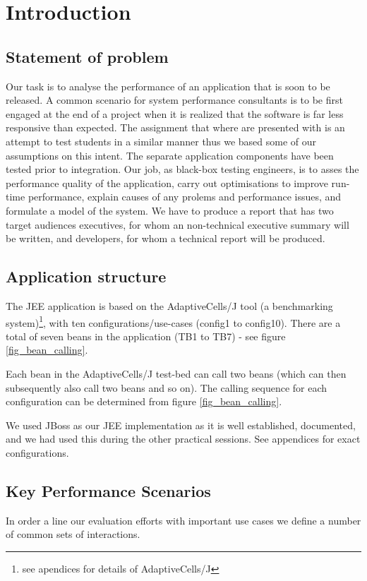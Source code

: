 \chapter{Introduction}

\section{Statement of problem}

Our task is to analyse the performance of an application that is soon to be released. A common scenario for system performance consultants is to be first engaged at the end of a project when it is realized that the software is far less responsive than expected. The assignment that where are presented with is an attempt to test students in a similar manner thus we based some of our assumptions on this intent. The separate application components have been tested prior to integration. Our job, as black-box testing engineers, is to asses the performance quality of the application, carry out optimisations to improve run-time performance, explain causes of any prolems and performance issues, and formulate a model of the system. We have to produce a report that has two target audiences executives, for whom an non-technical executive summary will be written, and developers, for whom a technical report will be produced.

\section{Application structure}

The JEE application is based on the AdaptiveCells/J tool (a benchmarking system)\footnote{see apendices for details of AdaptiveCells/J}, with ten configurations/use-cases (config1 to config10). There are a total of seven beans in the application (TB1 to TB7) - see figure \ref{fig_bean_calling}.

Each bean in the AdaptiveCells/J test-bed can call two beans (which can then subsequently also call two beans and so on). The calling sequence for each configuration can be determined from figure \ref{fig_bean_calling}.

We used JBoss as our JEE implementation as it is well established, documented, and we had used this during the other practical sessions. See appendices for exact configurations.


\section{Key Performance Scenarios}
In order a line our evaluation efforts with important use cases we define a number of common sets of interactions. 

